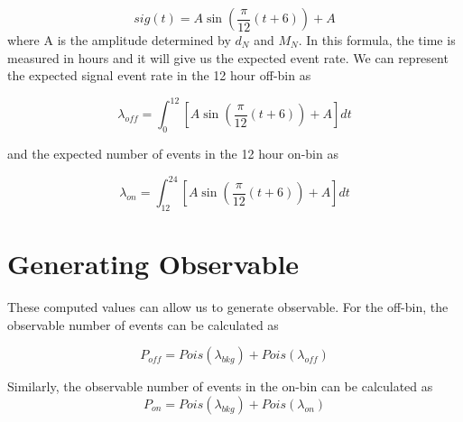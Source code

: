 \documentclass{article}
\begin{document}
\begin{equation}
    sig(t) = A\sin\left(\frac{\pi}{12}\left(t+6\right)\right)+A 
\end{equation}
where A is the amplitude determined by $d_{N}$ and $M_{N}$. In this formula, the time is measured in hours and it will give us the expected event rate. We can represent the expected signal event rate in the 12 hour off-bin as

\begin{equation}
  \lambda_{off} = \int_{0}^{12} [A\sin\left(\frac{\pi}{12}\left(t+6\right)\right)+A] dt
\end{equation}

and the expected number of events in the 12 hour on-bin as

\begin{equation}
   \lambda_{on} = \int_{12}^{24} [A\sin\left(\frac{\pi}{12}\left(t+6\right)\right)+A] dt
\end{equation}

\section{Generating Observable}
These computed values can allow us to generate observable. For the off-bin, the observable number of events can be calculated as

\begin{equation}
    P_{off} = Pois(\lambda_{bkg}) + Pois(\lambda_{off})
\end{equation}

Similarly, the observable number of events in the on-bin can be calculated as 
\begin{equation}
    P_{on} = Pois(\lambda_{bkg}) + Pois(\lambda_{on})
\end{equation}
\end{document}
